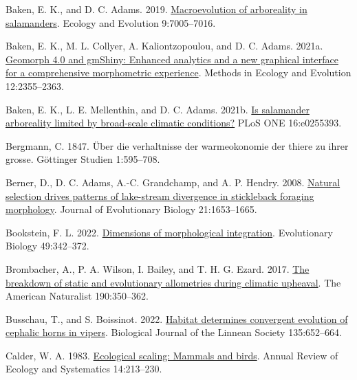 \documentclass[
  11pt,
]{article}
\newlength{\cslhangindent}
\newlength{\cslentryspacingunit} %
\newenvironment{CSLReferences}[2] %
 {%
  \setlength{\parindent}{0pt}
  \ifodd #1
  \let\oldpar\par
  \def\par{\hangindent=\cslhangindent\oldpar}
  \fi
  \setlength{\parskip}{#2\cslentryspacingunit}
 }%
 {}
\begin{document}
\begin{CSLReferences}{1}{0}
\leavevmode{}%
Baken, E. K., and D. C. Adams. 2019.
\href{https://doi.org/10.1002/ece3.5267}{Macroevolution of arboreality
in salamanders}. Ecology and Evolution 9:7005--7016.

\leavevmode{}%
Baken, E. K., M. L. Collyer, A. Kaliontzopoulou, and D. C. Adams. 2021a.
\href{https://doi.org/10.1111/2041-210X.13723}{Geomorph 4.0 and gmShiny:
Enhanced analytics and a new graphical interface for a comprehensive
morphometric experience}. Methods in Ecology and Evolution
12:2355--2363.

\leavevmode{}%
Baken, E. K., L. E. Mellenthin, and D. C. Adams. 2021b.
\href{https://doi.org/10.1371/journal.pone.0255393}{Is salamander
arboreality limited by broad-scale climatic conditions?} PLoS ONE
16:e0255393.

\leavevmode{}%
Bergmann, C. 1847. {Ü}ber die verhaltnisse der warmeokonomie der thiere
zu ihrer grosse. G{ö}ttinger Studien 1:595--708.

\leavevmode{}%
Berner, D., D. C. Adams, A.-C. Grandchamp, and A. P. Hendry. 2008.
\href{https://doi.org/10.1111/j.1420-9101.2008.01583.x}{Natural
selection drives patterns of lake-stream divergence in stickleback
foraging morphology}. Journal of Evolutionary Biology 21:1653--1665.

\leavevmode{}%
Bookstein, F. L. 2022.
\href{https://doi.org/10.1007/s11692-022-09574-0}{Dimensions of
morphological integration}. Evolutionary Biology 49:342--372.

\leavevmode{}%
Brombacher, A., P. A. Wilson, I. Bailey, and T. H. G. Ezard. 2017.
\href{https://doi.org/10.1086/692570}{The breakdown of static and
evolutionary allometries during climatic upheaval}. The American
Naturalist 190:350--362.

\leavevmode{}%
Busschau, T., and S. Boissinot. 2022.
\href{https://doi.org/10.1093/biolinnean/blac008}{{Habitat determines
convergent evolution of cephalic horns in vipers}}. Biological Journal
of the Linnean Society 135:652--664.

\leavevmode{}%
Calder, W. A. 1983.
\href{https://doi.org/10.1146/annurev.es.14.110183.001241}{Ecological
scaling: Mammals and birds}. Annual Review of Ecology and Systematics
14:213--230.


\end{CSLReferences}
\end{document}
